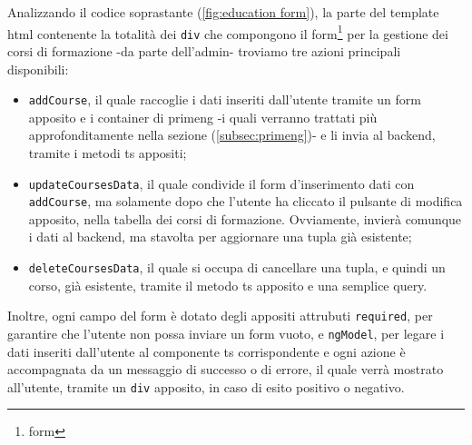 Analizzando il codice soprastante (\ref{fig:education form}), la parte del template \acrshort{html} contenente la totalità dei \texttt{div} che compongono il form\footnote{\glsdesc{form}} per la gestione dei corsi di formazione -da parte dell'admin- troviamo tre azioni principali disponibili:
\begin{itemize}
  \item \texttt{addCourse}, il quale raccoglie i dati inseriti dall'utente tramite un form apposito e i container di \acrshort{primeng} -i quali verranno trattati più approfonditamente nella sezione (\ref{subsec:primeng})- e li invia al backend, tramite i metodi \acrshort{ts} appositi;
  \item \texttt{updateCoursesData}, il quale condivide il form d'inserimento dati con \texttt{addCourse}, ma solamente dopo che l'utente ha cliccato il pulsante di modifica apposito, nella tabella dei corsi di formazione. Ovviamente, invierà comunque i dati al backend, ma stavolta per aggiornare una tupla già esistente;
  \item \texttt{deleteCoursesData}, il quale si occupa di cancellare una tupla, e quindi un corso, già esistente, tramite il metodo \acrshort{ts} apposito e una semplice query.
\end{itemize}
Inoltre, ogni campo del form è dotato degli appositi attrubuti \texttt{required}, per garantire che l'utente non possa inviare un form vuoto, e \texttt{ngModel}, per legare i dati inseriti dall'utente al componente \acrshort{ts} corrispondente e ogni azione è accompagnata da un messaggio di successo o di errore, il quale verrà mostrato all'utente, tramite un \texttt{div} apposito, in caso di esito positivo o negativo.\newline

